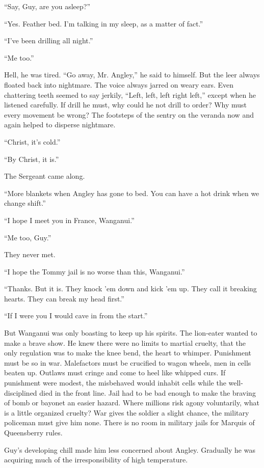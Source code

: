 ``Say, Guy, are you asleep?''

``Yes. Feather bed. I'm talking in my sleep, as a matter of fact.''

``I've been drilling all night.''

``Me too.''

Hell, he was tired. ``Go away, Mr. Angley,'' he said to himself. But 
the leer always floated back into nightmare. The voice always jarred 
on weary ears. Even chattering teeth seemed to say jerkily, ``Left, 
left, left right left,'' except when he listened carefully. If drill 
he must, why could he not drill to order? Why must every movement be 
wrong? The footsteps of the sentry on the veranda now and again 
helped to disperse nightmare.

``Christ, it's cold.''

``By Christ, it is.''

The Sergeant came along.

``More blankets when Angley has gone to bed. You can have a hot drink when 
we change shift.''

``I hope I meet you in France, Wanganui.''

``Me too, Guy.''

They never met.

``I hope the Tommy jail is no worse than this, Wanganui.''

``Thanks. But it is. They knock 'em down and kick 'em up. They call it 
breaking hearts. They can break my head first.''

``If I were you I would cave in from the start.''

But Wanganui was only boasting to keep up his spirits. The lion-eater 
wanted to make a brave show. He knew there were no limits to martial 
cruelty, that the only regulation was to make the knee bend, the heart 
to whimper. Punishment must be so in war. Malefactors must be crucified 
to wagon wheels, men in cells beaten up. Outlaws must cringe and come 
to heel like whipped curs. If punishment were modest, the misbehaved 
would inhabit cells while the well-disciplined died in the front line. 
Jail had to be bad enough to make the braving of bomb or bayonet an 
easier hazard. Where millions risk agony voluntarily, what is a little 
organized cruelty? War gives the soldier a slight chance, the military 
policeman must give him none. There is no room in military jails for 
Marquis of Queensberry rules.

Guy's developing chill made him less concerned about Angley. Gradually 
he was acquiring much of the irresponsibility of high temperature.

